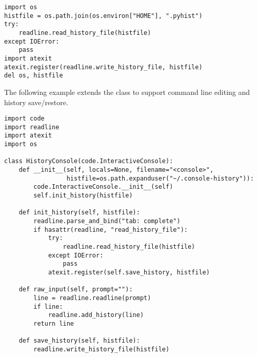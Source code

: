 \begin{verbatim}
import os
histfile = os.path.join(os.environ["HOME"], ".pyhist")
try:
    readline.read_history_file(histfile)
except IOError:
    pass
import atexit
atexit.register(readline.write_history_file, histfile)
del os, histfile
\end{verbatim}

The following example extends the  class to
support command line editing and history save/restore.

\begin{verbatim}
import code
import readline
import atexit
import os

class HistoryConsole(code.InteractiveConsole):
    def __init__(self, locals=None, filename="<console>",
                 histfile=os.path.expanduser("~/.console-history")):
        code.InteractiveConsole.__init__(self)
        self.init_history(histfile)

    def init_history(self, histfile):
        readline.parse_and_bind("tab: complete")
        if hasattr(readline, "read_history_file"):
            try:
                readline.read_history_file(histfile)
            except IOError:
                pass
            atexit.register(self.save_history, histfile)

    def raw_input(self, prompt=""):
        line = readline.readline(prompt)
        if line:
            readline.add_history(line)
        return line

    def save_history(self, histfile):
        readline.write_history_file(histfile)
\end{verbatim}

